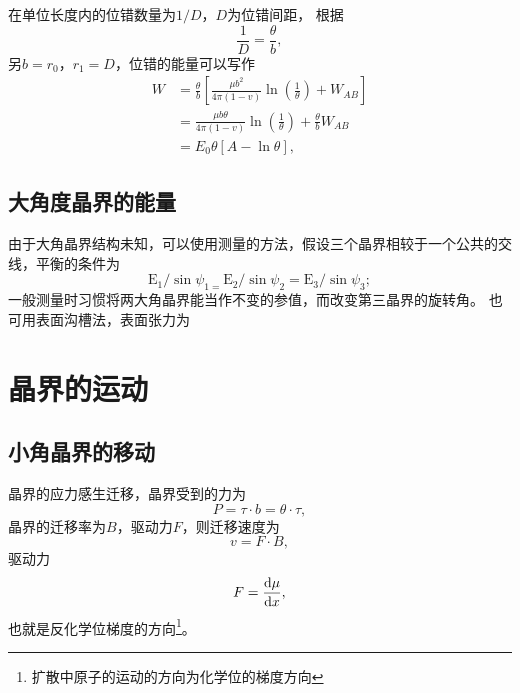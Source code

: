             在单位长度内的位错数量为$1/D$，$D$为位错间距，
            根据
            \begin{equation}
                \frac{1}{D}=\frac{\theta}{b},
            \end{equation}
            另$b=r_0$，$r_1=D$，位错的能量可以写作
            \begin{equation}
                \begin{split}
                    W&=\frac{\theta}{b}\left[\frac{\mu b^{2}}{4 \pi(1-v)} \ln \left(\frac{1}{\theta}\right)+W_{A B}\right]\\
                    &=\frac{\mu b \theta}{4 \pi(1-v)} \ln \left(\frac{1}{\theta}\right)+\frac{\theta}{b} W_{A B}\\
                    &=E_{0} \theta[A-\ln \theta],
                \end{split}
            \end{equation}
            
        \subsection{大角度晶界的能量}
            由于大角晶界结构未知，可以使用测量的方法，假设三个晶界相较于一个公共的交线，平衡的条件为
            \begin{equation}
                \mathrm{E}_{1} / \sin \psi_{1=} \mathrm{E}_{2} / \sin \psi_{2}=\mathrm{E}_{3} / \sin \psi_{3};
            \end{equation}
            一般测量时习惯将两大角晶界能当作不变的参值，而改变第三晶界的旋转角。
            也可用表面沟槽法，表面张力为
    \section{晶界的运动}
        \subsection{小角晶界的移动}
            晶界的应力感生迁移，晶界受到的力为
            \begin{equation}
                P=\tau\cdot b=\theta\cdot\tau,
            \end{equation}
            晶界的迁移率为$B$，驱动力$F$，则迁移速度为
            \begin{equation}
                v=F\cdot B,
            \end{equation}
            驱动力
            \begin{equation}
                F=\frac{\mathop{}\!\mathrm{d} \mu}{\mathop{}\!\mathrm{d} x},
            \end{equation}
            也就是反化学位梯度的方向\footnote{扩散中原子的运动的方向为化学位的梯度方向}。
            
